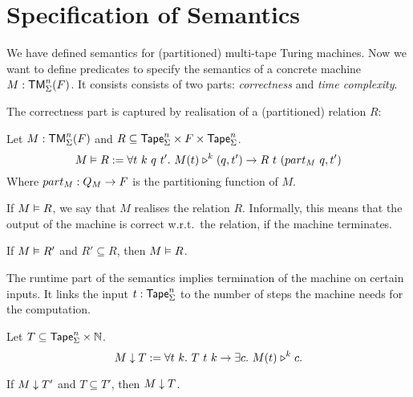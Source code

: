 \section{Specification of Semantics}
\label{sec:spec_semantics}

We have defined semantics for (partitioned) multi-tape Turing machines.  Now we want to define predicates to specify the semantics of a concrete
machine $M: \mathsf{TM}_\Sigma^n(F)$.  It consists consists of two parts: \emph{correctness} and \emph{time complexity}.

The correctness part is captured by realisation of a (partitioned) relation $R$:

\begin{definition}[Realisation][Realise]
  \label{def:realisation}
  Let $M:\mathsf{TM}_\Sigma^n(F)$ and $R \subseteq \mathsf{Tape}_\Sigma^n \times F \times \mathsf{Tape}_\Sigma^n$.
  \[
    M \mathrel{\vDash} R :=
    \forall t~k~q~t'.~M(t) \mathrel{\triangleright}^k (q, t') \rightarrow
    R~t~(part_M~q, t')
  \]
  Where $part_M : Q_M \rightarrow F$ is the partitioning function of $M$.
\end{definition}

If $M \mathrel{\vDash} R$, we say that $M$ realises the relation $R$.  Informally, this means that the output of the machine is correct w.r.t.\ the relation,
if the machine terminates.

\begin{lemma}
  \label{lem:Realise_monotone}
  If $M \mathrel{\vDash} R'$ and $R' \subseteq R$, then $M \mathrel{\vDash} R$.
\end{lemma}

The runtime part of the semantics implies termination of the machine on certain inputs.  It links the input $t:\mathsf{Tape}_\Sigma^n$ to the number of steps
the machine needs for the computation.

\begin{definition}
  \label{def:TerminatesIn}
  Let $T \subseteq \mathsf{Tape}_\Sigma^n \times \mathbb{N}$.
  \[
    M \mathrel{\downarrow} T :=
    \forall t~k.~T~t~k \rightarrow
    \exists c.~M (t) \mathrel{\triangleright}^k c.
  \]
\end{definition}


\begin{lemma}
  \label{lem:TerminatesIn_monotone}
  If $M \mathrel{\downarrow} T'$ and $T \subseteq T'$, then $M \mathrel{\downarrow} T$.
\end{lemma}


